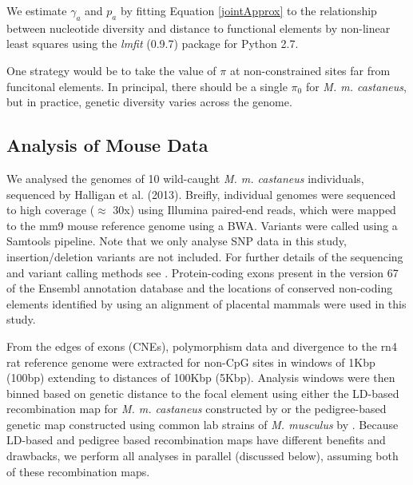 \documentclass[11pt]{article}
\begin{document}
	We estimate $\gamma_a$ and $p_a$ by fitting Equation \ref{jointApprox} to	the relationship between nucleotide diversity and distance to functional elements by non-linear least squares using the \emph{lmfit} (0.9.7) package for Python 2.7.
	
	
	 One strategy would be to take the value of $\pi$ at non-constrained sites far from funcitonal elements. In principal, there should be a single $\pi_0$ for \textit{M. m. castaneus}, but in practice, genetic diversity varies across the genome. 

	\subsection*{Analysis of Mouse Data}

	We analysed the genomes of 10 wild-caught \textit{M. m. castaneus} individuals, sequenced by Halligan et al. (2013). Breifly, individual genomes were sequenced to high coverage ($\approx$ 30x) using Illumina paired-end reads, which were mapped to the mm9 mouse reference genome using a BWA. Variants were called using a Samtools pipeline. Note that we only analyse SNP data in this study, insertion/deletion variants are not included. For further details of the sequencing and variant calling methods see \cite{RN122}. Protein-coding exons present in the version 67 of the Ensembl annotation database and the locations of conserved non-coding elements identified by \cite{RN122} using an alignment of placental mammals were used in this study.

	From the edges of exons (CNEs), polymorphism data and divergence to the rn4 rat reference genome were extracted for non-CpG sites in windows of 1Kbp (100bp) extending to distances of 100Kbp (5Kbp). Analysis windows were then binned based on genetic distance to the focal element using either the LD-based recombination map for \textit{M. m. castaneus} constructed by \cite{RN340} or the pedigree-based genetic map constructed using common lab strains of \textit{M. musculus} by \cite{RN232}. Because LD-based and pedigree based recombination maps have different benefits and drawbacks, we perform all analyses in parallel (discussed below), assuming both of these recombination maps.
\end{document}
